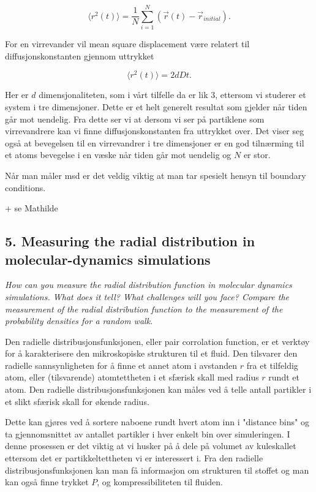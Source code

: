 \documentclass[a4paper,10pt]{article}
\begin{document}
\begin{equation}
 \langle r^2(t)\rangle = \frac{1}{N}\sum_{i=1}^N(\overrightarrow{r}(t)-\overrightarrow{r}_{initial}).
\end{equation}

For en virrevander vil mean square displacement være relatert til diffusjonskonstanten gjennom uttrykket

\begin{equation}
 \langle r^2(t)\rangle = 2dDt.
\end{equation}

Her er $d$ dimensjonaliteten, som i vårt tilfelle da er lik $3$, ettersom vi studerer et system i tre dimensjoner. Dette er et helt generelt resultat som gjelder når tiden går mot uendelig. Fra dette ser vi at dersom vi ser på partiklene som virrevandrere kan vi finne diffusjonskonstanten fra uttrykket over. Det viser seg også at bevegelsen til en virrevandrer i tre dimensjoner er en god tilnærming til et atoms bevegelse i en væske når tiden går mot uendelig og $N$ er stor. 

Når man måler msd er det veldig viktig at man tar spesielt hensyn til boundary conditions. 

+ se Mathilde


\subsection*{5. Measuring the radial distribution in molecular-dynamics simulations}
\textit{How can you measure the radial distribution function in molecular dynamics
simulations. What does it tell? What challenges will you face? Compare
the measurement of the radial distribution function to the measurement of the
probability densities for a random walk.}

Den radielle distribusjonsfunksjonen, eller pair corrolation function, er et verktøy for å karakterisere den mikroskopiske strukturen til et fluid. Den tilsvarer den radielle sannsynligheten for å finne et annet atom i avstanden $r$ fra et tilfeldig atom, eller (tilsvarende) atomtettheten i et sfærisk skall med radius $r$ rundt et atom. Den radielle distribusjonsfunksjonen kan måles ved å telle antall partikler i et slikt sfærisk skall for økende radius.

Dette kan gjøres ved å sortere naboene rundt hvert atom inn i "distance bins" og ta gjennomsnittet av antallet partikler i hver enkelt bin over simuleringen. I denne prosessen er det viktig at vi husker på å dele på volumet av kuleskallet ettersom det er partikkeltettheten vi er interessert i. Fra den radielle distribusjonsfunksjonen kan man få informasjon om strukturen til stoffet og man kan også finne trykket $P$, og kompressibiliteten til fluiden. 
\end{document}

